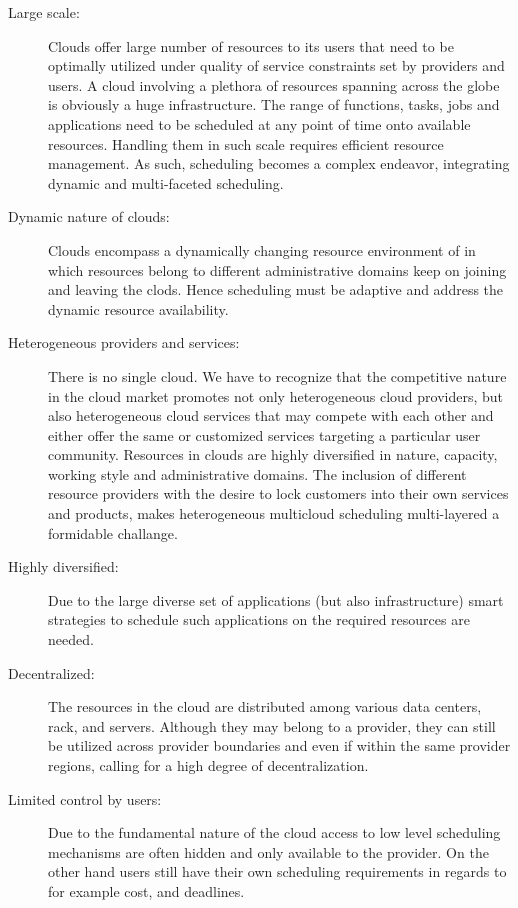 \documentclass[final,5p,times,twocolumn]{elsarticle}
\begin{document}
\begin{description}

\item [Large scale:] Clouds offer large number of resources to its
  users that need to be optimally utilized under quality of service
  constraints set by providers and users. A cloud involving a plethora
  of resources spanning across the globe is obviously a huge
  infrastructure. The range of functions, tasks, jobs and applications
  need to be scheduled at any point of time onto available resources.
  Handling them in such scale requires efficient resource management.
  As such, scheduling becomes a complex endeavor, integrating dynamic
  and multi-faceted scheduling. 
            
\item [Dynamic nature of clouds:] Clouds encompass a dynamically
  changing resource environment of in which resources belong to
  different administrative domains keep on joining and leaving the
  clods. Hence scheduling must be adaptive and address the dynamic
  resource availability.

\item[Heterogeneous providers and services:] There is no single cloud.
  We have to recognize that the competitive nature in the cloud
  market promotes not only heterogeneous cloud providers, but also
  heterogeneous cloud services that may compete with each other and
  either offer the same or customized services targeting a particular
  user community. Resources in clouds are highly
  diversified in nature, capacity, working style and administrative
  domains. The inclusion of different resource providers with the
  desire to lock customers into their own services and products, makes
  heterogeneous multicloud scheduling multi-layered a formidable challange.

\item [Highly diversified:] Due to the large diverse set of
  applications (but also infrastructure) smart strategies to schedule
  such applications on the required resources are needed.

\item [Decentralized:] The resources in the cloud are distributed
  among various data centers, rack, and servers. Although they may
  belong to a provider, they can still be utilized across provider
  boundaries and even if within the same provider regions, calling for
  a high degree of decentralization.

\item[Limited control by users:] Due to the fundamental nature of the
  cloud access to low level scheduling mechanisms are often hidden and
  only available to the provider. On the other hand users still have
  their own scheduling requirements in regards to for example cost,
  and deadlines.
  

\end{description}
\end{document}
